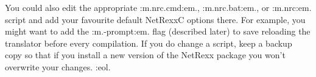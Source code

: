 You could also edit the appropriate :m.nrc.cmd:em., :m.nrc.bat:em.,
or :m.nrc:em. script and add your favourite default NetRexxC
options there.
For example, you might want to add the :m.-prompt:em. flag (described
later) to save reloading the translator before every compilation.
If you do change a script, keep a backup copy so that if you install
a new version of the NetRexx package you won't overwrite your changes.
:eol.

